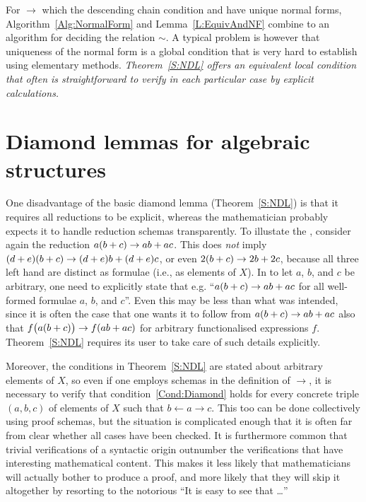 \documentclass[12pt]{article}
\theoremstyle{definition}
\begin{document}
For  $\rightarrow$ which 
 the descending chain 
condition and have unique normal forms, Algorithm~\ref{Alg:NormalForm} 
and Lemma~\ref{L:EquivAndNF} 
combine to an algorithm for deciding the 
relation $\sim$. A typical problem is however that uniqueness of the 
normal form is a global condition that is very hard to establish 
using elementary methods. 
\emph{Theorem~\ref{S:NDL} offers an 
equivalent local condition that often is straightforward to verify in 
each particular case by explicit calculations.}


\section{Diamond lemmas for algebraic structures}

One disadvantage of the basic diamond lemma (Theorem~\ref{S:NDL}) is 
that it requires all reductions to be explicit, whereas the 
 mathematician probably expects it 
to handle reduction schemas transparently. To illustate the 
, consider again the 
reduction \(a(b +\nobreak c) \rightarrow ab+ac\). This does 
\emph{not} imply \((d +\nobreak e)(b +\nobreak c) \rightarrow 
(d +\nobreak e)b + (d +\nobreak e)c\), or even \(2(b +\nobreak c) 
\rightarrow 2b + 2c\), because all three left hand 
 are distinct as formulae 
(i.e., as elements of $X$). In  to let $a$, $b$, and 
$c$ be arbitrary, one need to explicitly state that e.g.\@ 
``\(a(b +\nobreak c) \rightarrow ab+ac\) for all well-formed formulae 
$a$, $b$, and $c$''. Even this may be less than what was intended, 
since it is often the case that one wants it to follow from 
\(a(b +\nobreak c) \rightarrow ab+ac\) also that 
\(f\bigl( a(b +\nobreak c) \bigr) \rightarrow f(ab +\nobreak ac)\) 
for arbitrary functionalised expressions $f$. Theorem~\ref{S:NDL} 
requires its user to take care of such details explicitly.

Moreover, the conditions in Theorem~\ref{S:NDL} are stated about 
arbitrary elements of $X$, so even if one employs schemas in the 
definition of $\rightarrow$, it is necessary to verify that 
condition~\ref{Cond:Diamond} holds for every concrete triple $(a,b,c)$ 
of elements of $X$ such that \(b \leftarrow a \rightarrow c\). This too 
can be done collectively using proof schemas, but the situation is 
complicated enough that it is often far from clear whether all cases 
have been checked. It is furthermore common that trivial 
verifications of a syntactic origin outnumber the verifications that 
have interesting mathematical content. This makes it less likely that 
mathematicians will actually bother to produce a 
 proof, and 
more likely that they will skip it altogether by resorting to the 
notorious ``It is easy to see that \dots''
\end{document}
